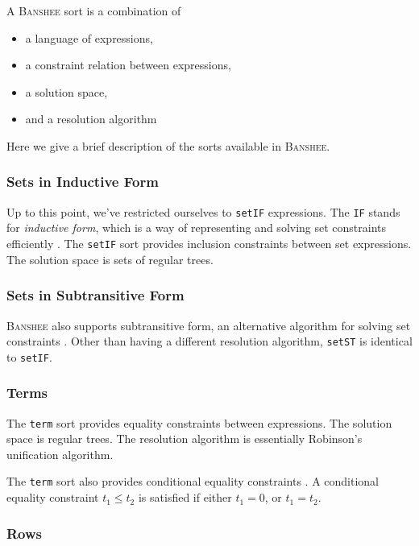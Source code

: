 \documentclass[10pt]{article}
\newcommand{\banshee}{\textsc{Banshee}}
\begin{document}
A \banshee{} sort is a combination of
\begin{itemize}
        \item a language of expressions,
        \item a constraint relation between expressions,
        \item a solution space,
        \item and a resolution algorithm
\end{itemize}

Here we give a brief description of the sorts available in \banshee{}.

\subsubsection{Sets in Inductive Form}

Up to this point, we've restricted ourselves to \texttt{setIF}
expressions. The \texttt{IF} stands for \emph{inductive form}, which
is a way of representing and solving set constraints efficiently
\cite{aiken:tic98}. The \texttt{setIF} sort provides inclusion
constraints between set expressions. The solution space is sets of
regular trees.

\subsubsection{Sets in Subtransitive Form}

\banshee{} also supports subtransitive form, an alternative algorithm
for solving set constraints \cite{heintze:pldi01}. Other than having a
different resolution algorithm, \texttt{setST} is identical to
\texttt{setIF}. 

\subsubsection{Terms}

The \texttt{term} sort provides equality constraints between
expressions. The solution space is regular trees. The resolution
algorithm is essentially Robinson's unification algorithm. 
  
The \texttt{term} sort also provides conditional equality constraints
\cite{steensgaard:popl96}. A conditional equality constraint $t_1
\leq t_2$ is satisfied if either $t_1 = 0$, or $t_1 = t_2$.

\subsubsection{Rows}
\end{document}
